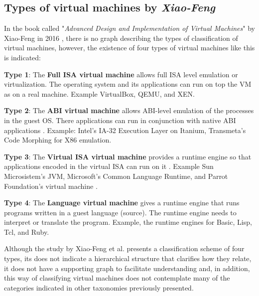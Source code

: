 	\subsection{Types of virtual machines by \textit{Xiao-Feng}}
	
	In the book called "\textit{Advanced Design and Implementation of Virtual Machines}" by Xiao-Feng in 2016 \cite{Xiao-Feng2016}, there is no graph describing the types of classification of virtual machines, however, the existence of four types of virtual machines like this is indicated:
	
	\textbf{Type 1}: The \textbf{Full ISA virtual machine} allows full ISA level emulation or virtualization. The operating system and its applications can run on top the VM as on a real machine\cite{Xiao-Feng2016}. Example VirtualBox, QEMU, and XEN.
	
	\textbf{Type 2}: The \textbf{ABI virtual machine} allows ABI-level emulation of the processes in the guest OS. There applications can run in conjunction with native ABI applications \cite{Xiao-Feng2016}. Example: Intel's IA-32 Execution Layer on Itanium, Transmeta's Code Morphing for X86 emulation.
	
	\textbf{Type 3}: The \textbf{Virtual ISA virtual machine} provides a runtime engine so that applications encoded in the virtual ISA can run on it \cite{Xiao-Feng2016}. Example Sun Microsistem's JVM, Microsoft's Common Language Runtime, and Parrot Foundation's virtual machine \cite{Parrot}.
	
	\textbf{Type 4}: The \textbf{Language virtual machine} gives a runtime engine that runs programs written in a guest language (source). The runtime engine needs to interpret or translate the program. Example, the runtime engines for Basic, Lisp, Tcl, and Ruby.
	
	Although the study by Xiao-Feng et al. presents a classification scheme of four types, its does not indicate a hierarchical structure that clarifies how they relate, it does not have a supporting graph to facilitate understanding and, in addition, this way of classifying virtual machines does not contemplate many of the categories indicated in other taxonomies previously presented.
	
	